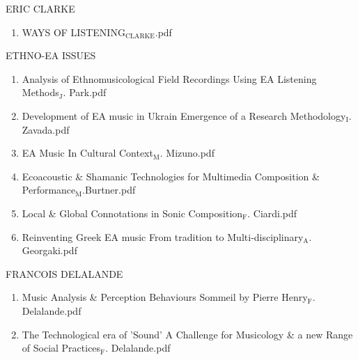 \documentclass[11pt]{article}
\begin{document}
\item ERIC CLARKE
\label{sec-1-1-1-1-49-1-10}
\begin{enumerate}
\item WAYS OF LISTENING$_{\text{CLARKE}}$.pdf
\label{sec-1-1-1-1-49-1-10-1}
\end{enumerate}

\item ETHNO-EA ISSUES
\label{sec-1-1-1-1-49-1-11}
\begin{enumerate}
\item Analysis of Ethnomusicological Field Recordings Using EA Listening Methods$_{\text{J}}$. Park.pdf
\label{sec-1-1-1-1-49-1-11-1}

\item Development of EA music in Ukrain Emergence of a Research Methodology$_{\text{I}}$. Zavada.pdf
\label{sec-1-1-1-1-49-1-11-2}

\item EA Music In Cultural Context$_{\text{M}}$. Mizuno.pdf
\label{sec-1-1-1-1-49-1-11-3}

\item Ecoacoustic \& Shamanic Technologies for Multimedia Composition \& Performance$_{\text{M}}$.Burtner.pdf
\label{sec-1-1-1-1-49-1-11-4}

\item Local \& Global Connotations in Sonic Composition$_{\text{F}}$. Ciardi.pdf
\label{sec-1-1-1-1-49-1-11-5}

\item Reinventing Greek EA music From tradition to Multi-disciplinary$_{\text{A}}$. Georgaki.pdf
\label{sec-1-1-1-1-49-1-11-6}
\end{enumerate}

\item FRANCOIS DELALANDE
\label{sec-1-1-1-1-49-1-12}
\begin{enumerate}
\item Music Analysis \& Perception Behaviours Sommeil by Pierre Henry$_{\text{F}}$. Delalande.pdf
\label{sec-1-1-1-1-49-1-12-1}

\item The Technological era of 'Sound' A Challenge for Musicology \& a new Range of Social Practices$_{\text{F}}$. Delalande.pdf
\label{sec-1-1-1-1-49-1-12-2}
\end{enumerate}
\end{document}
